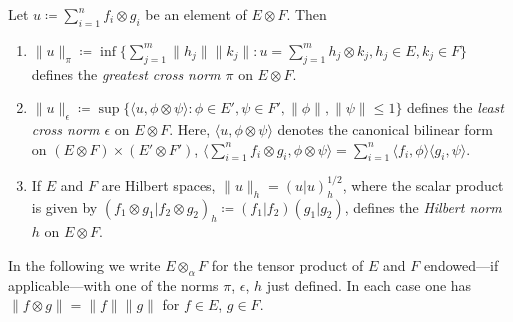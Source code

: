 Let $u \coloneq \sum_{i=1}^{n} f_{i} \otimes g_{i}$ be an element of\/ $E \otimes F$. 
Then
\begin{enumerate}[--,labelindent=.25em]

\item
$\|u\|_{\pi} \coloneq \inf\{\sum_{j=1}^{m} \|h_{j}\| \|k_{j}\| \colon u = \sum_{j=1}^{m}h_{j} \otimes k_{j}, h_{j} \in E, k_{j} \in F\}$ defines the \emph{greatest cross norm $\pi$} on $E \otimes F$.

\item
$\|u\|_{\epsilon} \coloneq \sup\{\langle u,\phi \otimes \psi\rangle \colon \phi \in E', \psi \in F', \|\phi\|, \|\psi\| \leq 1\}$ defines the 
\emph{least cross norm $\epsilon$} on $E \otimes F$. 
Here, $\langle u,\phi \otimes \psi\rangle$ denotes the canonical bilinear form on $(E \otimes F) \times (E' \otimes F')$, \ie $\langle\sum_{i=1}^{n} f_{i} \otimes g_{i},\phi \otimes \psi\rangle = \sum_{i=1}^{n} \langle f_{i},\phi\rangle\langle g_{i},\psi\rangle$.

\item
If\/ $E$ and $F$ are Hilbert spaces, $\|u\|_{h} = (u|u)_{h}^{1/2}$, where the scalar product is given by $(f_{1} \otimes g_{1} | f_{2} \otimes g_{2})_{h} \coloneq (f_{1}|f_{2})(g_{1}|g_{2})$, defines the \emph{Hilbert norm $h$} on $E \otimes F$.
\end{enumerate}
In the following we write $E \otimes_{\alpha} F$ for the tensor product of\/ $E$ and $F$ endowed---if applicable---with one of the norms $\pi$, $\epsilon$, $h$ just defined.
In each case one has $\|f \otimes g\| = \|f\| \|g\|$ for $f \in E$, $g \in F$.


